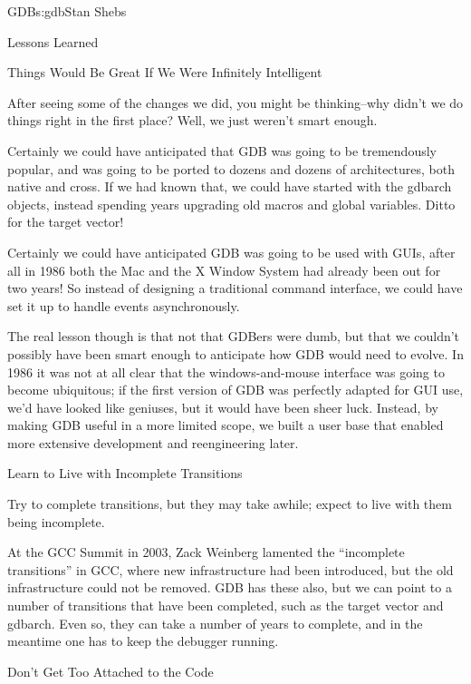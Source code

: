 \begin{aosachapter}{GDB}{s:gdb}{Stan Shebs}
\begin{aosasect1}{Lessons Learned}
\begin{aosasect2}{Things Would Be Great If We Were Infinitely Intelligent}

After seeing some of the changes we did, you might be thinking--why
didn't we do things right in the first place?  Well, we just weren't
smart enough.

Certainly we could have anticipated that GDB was going to be
tremendously popular, and was going to be ported to dozens and dozens
of architectures, both native and cross.  If we had known that, we
could have started with the gdbarch objects, instead spending years
upgrading old macros and global variables.  Ditto for the target
vector!

Certainly we could have anticipated GDB was going to be used with
GUIs, after all in 1986 both the Mac and the X Window System had
already been out for two years!  So instead of designing a traditional
command interface, we could have set it up to handle events
asynchronously.

The real lesson though is that not that GDBers were dumb, but that we
couldn't possibly have been smart enough to anticipate how GDB would
need to evolve.  In 1986 it was not at all clear that the
windows-and-mouse interface was going to become ubiquitous; if the
first version of GDB was perfectly adapted for GUI use, we'd have
looked like geniuses, but it would have been sheer luck.  Instead,
by making GDB useful in a more limited scope, we built a user base
that enabled more extensive development and reengineering later.

\end{aosasect2}

\begin{aosasect2}{Learn to Live with Incomplete Transitions}

Try to complete transitions, but they may take awhile; expect to live
with them being incomplete.

At the GCC Summit in 2003, Zack Weinberg lamented the ``incomplete
transitions'' in GCC, where new infrastructure had been introduced,
but the old infrastructure could not be removed.  GDB has these also,
but we can point to a number of transitions that have been completed,
such as the target vector and gdbarch.  Even so, they can take a
number of years to complete, and in the meantime one has to keep the
debugger running.

\end{aosasect2}

\begin{aosasect2}{Don't Get Too Attached to the Code}


\end{aosasect2}
\end{aosasect1}
\end{aosachapter}
